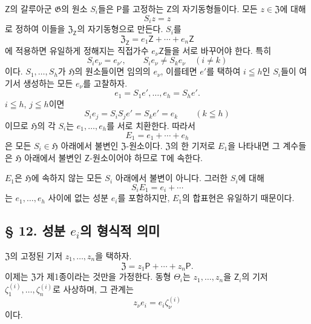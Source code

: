 \(\mathsf Z\)의 갈루아군 \(\mathfrak G\)의 원소 \(S_i\)들은 \(\mathsf P\)를 고정하는 \(\mathsf Z\)의 자기동형들이다. 모든 \(z\in\mathfrak Z\)에 대해
\[
        S_i z=z
\]
로 정하여 이들을 \(\mathfrak Z_{\mathsf Z}\)의 자기동형으로 만든다. \(S_i\)를
\[
        \mathfrak Z_{\mathsf Z}
        =e_1\mathsf Z+\cdots+e_n\mathsf Z
\]
에 적용하면 유일하게 정해지는 직접가수 \(e_\nu\mathsf Z\)들을 서로 바꾸어야 한다. 특히
\[
        S_i e_\nu=e_{\nu'},
        \qquad
        S_i e_\nu\ne S_k e_\nu\quad(i\ne k)
\]
이다. \(S_1,\ldots,S_h\)가 \(\mathfrak H\)의 원소들이면 임의의 \(e_\nu\), 이를테면 \(e'\)를 택하여 \(i\leqq h\)인 \(S_i\)들이 여기서 생성하는 모든 \(e_\nu\)를 고찰하자.
\[
        e_1=S_1e',\ldots,e_h=S_he'.
\]
\(i\leqq h\), \(j\leqq h\)이면
\[
        S_i e_j=S_iS_j e'=S_k e'=e_k
        \qquad(k\leqq h)
\]
이므로 \(\mathfrak H\)의 각 \(S_i\)는 \(e_1,\ldots,e_h\)를 서로 치환한다. 따라서
\[
        E_1=e_1+\cdots+e_h
\]
은 모든 \(S_i\in\mathfrak H\) 아래에서 불변인 \(\mathfrak Z\)-원소이다. \(\mathfrak Z\)의 한 기저로 \(E_1\)을 나타내면 그 계수들은 \(\mathfrak H\) 아래에서 불변인 \(\mathsf Z\)-원소이어야 하므로 \(\mathsf T\)에 속한다.

\(E_1\)은 \(\mathfrak H\)에 속하지 않는 모든 \(S_i\) 아래에서 불변이 아니다. 그러한 \(S_i\)에 대해
\[
        S_i E_1=e_i+\cdots
\]
는 \(e_1,\ldots,e_h\) 사이에 없는 성분 \(e_i\)를 포함하지만, \(E_1\)의 합표현은 유일하기 때문이다.

\subsection*{§ 12. 성분 \(e_i\)의 형식적 의미}

\(\mathfrak Z\)의 고정된 기저 \(z_1,\ldots,z_n\)을 택하자.
\[
        \mathfrak Z=z_1\mathsf P+\cdots+z_n\mathsf P.
\]
이제는 \(\mathfrak Z\)가 제1종이라는 것만을 가정한다. 동형 \(\Theta_i\)는 \(z_1,\ldots,z_n\)을 \(\mathsf Z_i\)의 기저 \(\zeta_1^{(i)},\ldots,\zeta_n^{(i)}\)로 사상하며, 그 관계는
\[
        z_\nu e_i=e_i\zeta_\nu^{(i)}
\]
이다.

